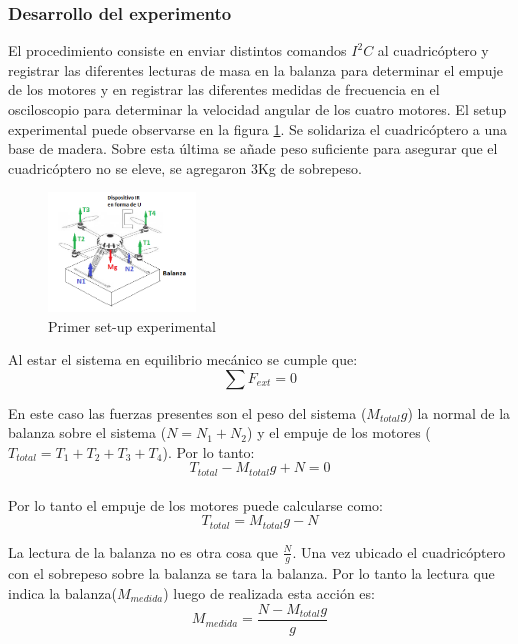 \documentclass[main]{subfiles}
\begin{document}
\subsubsection*{Desarrollo del experimento}
El procedimiento consiste en enviar distintos comandos $I^2C$ al cuadric\'optero y registrar las diferentes lecturas de masa en la balanza para determinar el empuje de los motores y en registrar las diferentes medidas de frecuencia en el osciloscopio para determinar la velocidad angular de los cuatro motores.
El setup experimental puede observarse en la figura \ref{fig:setup1}.
Se solidariza el cuadric\'optero a una base de madera. Sobre esta \'ultima se a\~nade peso suficiente para asegurar que el cuadric\'optero no se eleve, se agregaron 3Kg de sobrepeso.

\begin{figure}
\vspace{-25pt}
  \begin{center}
    \includegraphics[width=0.35\textwidth]{./pics_motores/set1.png}
  \end{center}
  \caption{Primer set-up experimental}
  \label{fig:setup1}
\end{figure}
	
Al estar el sistema en equilibrio mec\'anico se cumple que:
\begin{equation}
\sum F_{ext}=0
\end{equation}

En este caso las fuerzas presentes son el peso del sistema ($M_{total}g$) la normal de la balanza sobre el sistema ($N=N_1+N_2$) y el empuje de los motores ($T_{total}=T_1+T_2+T_3+T_4$). Por lo tanto:
\begin{equation}
T_{total}-M_{total}g+N=0
\end{equation}\\

Por lo tanto el empuje de los motores puede calcularse como:
\begin{equation}
T_{total}=M_{total}g-N
\end{equation}

La lectura de la balanza no es otra cosa que $\frac{N}{g}$.
Una vez ubicado el cuadric\'optero con el sobrepeso sobre la balanza se tara la balanza. Por lo tanto la lectura que indica la balanza($M_{medida}$) luego de realizada esta acci\'on es:
\begin{equation}
M_{medida}=\frac{N-M_{total}g}{g}
\end{equation}
\end{document}
